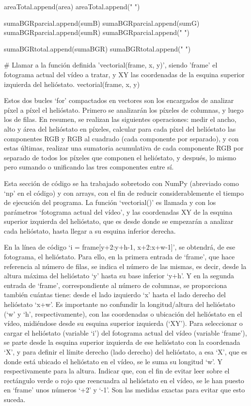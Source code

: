                 areaTotal.append(area)
                areaTotal.append("                       ")
                
                sumaBGRparcial.append(sumB)
                sumaBGRparcial.append(sumG)
                sumaBGRparcial.append(sumR)
                sumaBGRparcial.append("     ")
                
                sumaBGRtotal.append(sumaBGR)
                sumaBGRtotal.append("                       ")

            \# Llamar a la función definida 'vectorial(frame, x, y)', siendo 'frame' el fotograma actual del vídeo a tratar, y XY las coordenadas de la esquina superior izquierda del helióstato.
            vectorial(frame, x, y)
        
Estos dos bucles ‘for’ compactados en vectores son los encargados de analizar píxel a píxel el helióstato. Primero se analizarán los píxeles de columnas, y luego los de filas. En resumen, se realizan las siguientes operaciones: medir el ancho, alto y área del helióstato en píxeles, calcular para cada píxel del helióstato las componentes RGB y RGB al cuadrado (cada componente por separado), y con estas últimas, realizar una sumatoria acumulativa de cada componente RGB por separado de todos los píxeles que componen el helióstato, y después, lo mismo pero sumando o unificando las tres componentes entre sí.

Esta sección de código se ha trabajado sobretodo con NumPy (abreviado como ‘np’ en el código) y con arrays, con el fin de reducir considerablemente el tiempo de ejecución del programa. La función ‘vectorial()’ es llamada y con los parámetros ‘fotograma actual del vídeo’, y las coordenadas XY de la esquina superior izquierda del helióstato, que es desde donde se empezarán a analizar cada helióstato, hasta llegar a su esquina inferior derecha.

En la línea de código ‘i = frame[y+2:y+h-1, x+2:x+w-1]’, se obtendrá, de ese fotograma, el helióstato. Para ello, en la primera entrada de ‘frame’, que hace referencia al número de filas, se indica el número de las mismas, es decir, desde la altura máxima del helióstato ‘y’ hasta su base inferior ‘y+h’. Y en la segunda entrada de ‘frame’, correspondiente al número de columnas, se proporciona también cuántas tiene: desde el lado izquierdo ‘x’ hasta el lado derecho del helióstato ‘x+w’. Es importante no confundir la longitud/altura del helióstato (‘w’ y ‘h’, respectivamente), con las coordenadas o ubicación del helióstato en el vídeo, midiéndose desde su esquina superior izquierda (‘XY’). Para seleccionar o cargar el helióstato (variable ‘i’) del fotograma actual del vídeo (variable ‘frame’), se parte desde la esquina superior izquierda de ese helióstato con la coordenada ‘X’, y para definir el límite derecho (lado derecho) del helióstato, a esa ‘X’, que es donde está ubicado el helióstato en el vídeo, se le suma su longitud ‘w’. Y respectivamente para la altura. Indicar que, con el fin de evitar leer sobre el rectángulo verde o rojo que reencuadra al helióstato en el vídeo, se le han puesto en ‘frame’ unos números ‘+2’ y ‘-1’. Son las medidas exactas para evitar que esto suceda.

